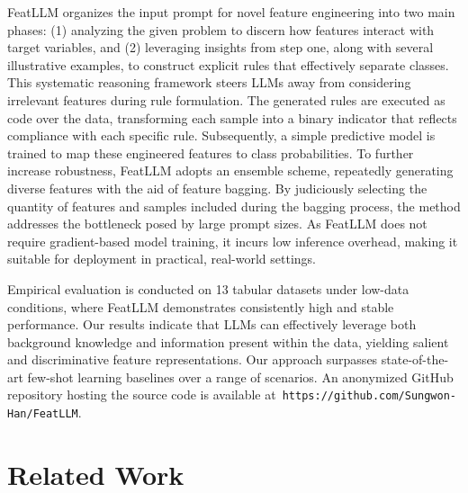 \textsf{FeatLLM} organizes the input prompt for novel feature engineering into two main phases: (1) analyzing the given problem to discern how features interact with target variables, and (2) leveraging insights from step one, along with several illustrative examples, to construct explicit rules that effectively separate classes. This systematic reasoning framework steers LLMs away from considering irrelevant features during rule formulation. The generated rules are executed as code over the data, transforming each sample into a binary indicator that reflects compliance with each specific rule. Subsequently, a simple predictive model is trained to map these engineered features to class probabilities. To further increase robustness, \textsf{FeatLLM} adopts an ensemble scheme, repeatedly generating diverse features with the aid of feature bagging. By judiciously selecting the quantity of features and samples included during the bagging process, the method addresses the bottleneck posed by large prompt sizes. As \textsf{FeatLLM} does not require gradient-based model training, it incurs low inference overhead, making it suitable for deployment in practical, real-world settings.

Empirical evaluation is conducted on 13 tabular datasets under low-data conditions, where \textsf{FeatLLM} demonstrates consistently high and stable performance. Our results indicate that LLMs can effectively leverage both background knowledge and information present within the data, yielding salient and discriminative feature representations. Our approach surpasses state-of-the-art few-shot learning baselines over a range of scenarios. An anonymized GitHub repository hosting the source code is available at~\texttt{https://github.com/Sungwon-Han/FeatLLM}.

\section{Related Work}

